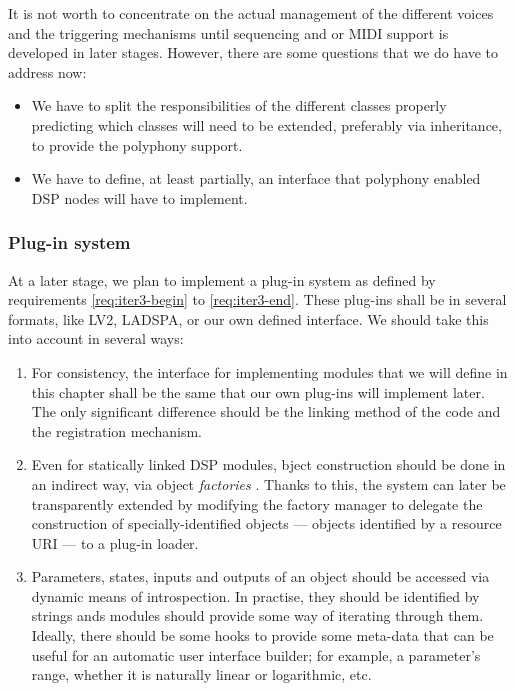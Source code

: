 It is not worth to concentrate on the actual management of the
different voices and the triggering mechanisms until sequencing and or
MIDI support is developed in later stages. However, there are some
questions that we do have to address now:
\begin{itemize}
\item We have to split the responsibilities of the different classes
properly predicting which classes will need to be extended, preferably
via inheritance, to provide the polyphony support.

\item We have to define, at least partially, an interface that
  polyphony enabled DSP nodes will have to implement.
\end{itemize}

\subsubsection{Plug-in system}

At a later stage, we plan to implement a plug-in system
as defined by requirements \ref{req:iter3-begin} to
\ref{req:iter3-end}. These plug-ins shall be in several formats, like
LV2, LADSPA, or our own
defined interface. We should take this into account in several ways:
\begin{enumerate}
\item For consistency, the interface for implementing modules that we
  will define in this chapter shall be the same that our own plug-ins
  will implement later. The only significant difference should be the
  linking method of the code and the registration mechanism.

\item Even for statically linked DSP modules, bject construction
  should be done in an indirect way, via object
  \emph{factories}
  \cite{gamma95design}. Thanks to this, the system can later be
  transparently extended by modifying the factory manager to delegate
  the construction of specially-identified objects --- objects
  identified by a resource URI \cite{mealling02rfc3305} --- to a
  plug-in loader.

\item Parameters, states, inputs and outputs of an object should be
  accessed via dynamic means of introspection. In practise, they
  should be identified by strings ands modules should provide some way
  of iterating through them. Ideally, there should be some hooks to
  provide some meta-data that can be useful for an automatic user
  interface builder; for example, a parameter's range, whether it is
  naturally linear or logarithmic, etc.
\end{enumerate}

